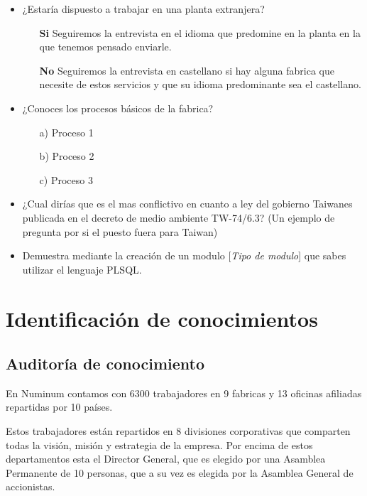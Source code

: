 \documentclass[a4paper]{article}
\begin{document}
\begin{itemize}
		\item ¿Estaría dispuesto a trabajar en una planta extranjera?
		\begin{itemize}
			\item[\textbf{Si}] Seguiremos la entrevista en el idioma que predomine en la planta en la que tenemos pensado enviarle.
			\item[\textbf{No}] Seguiremos la entrevista en castellano si hay alguna fabrica que necesite de estos servicios y que su idioma predominante sea el castellano.
		\end{itemize}
	\item ¿Conoces los procesos básicos de la fabrica?
	\begin{itemize}
		\item[a)] Proceso 1
		\item[b)] Proceso 2
		\item[c)] Proceso 3
	\end{itemize}
	
	\item ¿Cual dirías que es el mas conflictivo en cuanto a ley del gobierno Taiwanes publicada en el decreto de medio ambiente TW-74/6.3? (Un ejemplo de pregunta por si el puesto fuera para Taiwan)
	\item Demuestra mediante la creación de un modulo  [\textit{Tipo de modulo}] que sabes utilizar el lenguaje PLSQL.

\end{itemize}


\newpage

\section{Identificación de conocimientos}

\subsection{Auditoría de conocimiento}

En Numinum contamos con 6300 trabajadores en 9 fabricas y 13 oficinas afiliadas repartidas por 10 países.\par
Estos trabajadores están repartidos en 8 divisiones corporativas que comparten todas la visión, misión y estrategia de la empresa.
Por encima de estos departamentos esta el Director General, que es elegido por una Asamblea Permanente de 10 personas, que a su vez es elegida por la Asamblea General de accionistas.
\end{document}
